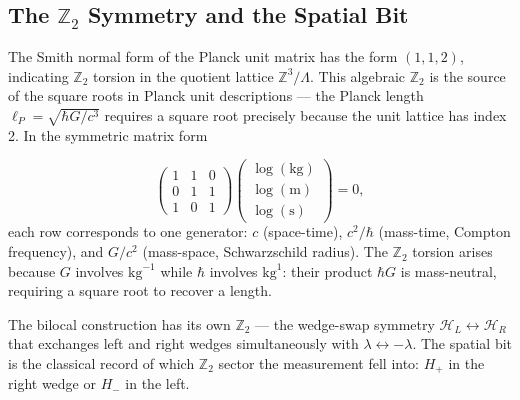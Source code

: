 \documentclass[12pt,a4paper]{article}
\begin{document}
\subsection{The \texorpdfstring{$\mathbb{Z}_2$}{Z2} 
Symmetry and the Spatial Bit}

The Smith normal form of the Planck unit matrix has 
the form $(1,1,2)$, indicating $\mathbb{Z}_2$ torsion 
in the quotient lattice $\mathbb{Z}^3/\Lambda$. This 
algebraic $\mathbb{Z}_2$ is the source of the square 
roots in Planck unit descriptions --- the Planck length 
$\ell_P = \sqrt{\hbar G/c^3}$ requires a square root 
precisely because the unit lattice has index 2. In the 
symmetric matrix form

\begin{equation}
\begin{pmatrix} 1 & 1 & 0 \\ 0 & 1 & 1 \\ 1 & 0 & 1 
\end{pmatrix} 
\begin{pmatrix} \log(\text{kg}) \\ \log(\text{m}) \\ 
\log(\text{s}) \end{pmatrix} = 0,
\end{equation}
each row corresponds to one generator: $c$ (space-time), 
$c^2/\hbar$ (mass-time, Compton frequency), and $G/c^2$ 
(mass-space, Schwarzschild radius). The $\mathbb{Z}_2$ 
torsion arises because $G$ involves $\text{kg}^{-1}$ 
while $\hbar$ involves $\text{kg}^1$: their product 
$\hbar G$ is mass-neutral, requiring a square root to 
recover a length.

The bilocal construction has its own $\mathbb{Z}_2$ --- 
the wedge-swap symmetry $\mathcal{H}_L \leftrightarrow 
\mathcal{H}_R$ that exchanges left and right wedges 
simultaneously with $\lambda \leftrightarrow -\lambda$. 
The spatial bit is the classical record of which 
$\mathbb{Z}_2$ sector the measurement fell into: 
$H_+$ in the right wedge or $H_-$ in the left. 

\end{document}
